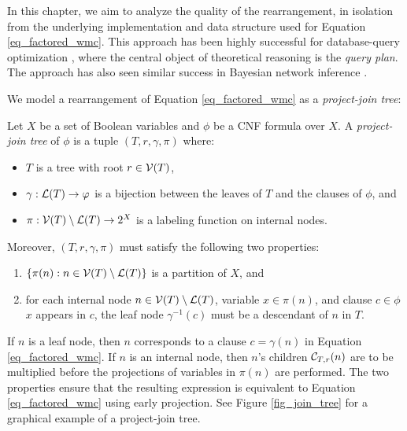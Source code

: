 In this chapter, we aim to analyze the quality of the rearrangement, in isolation from the underlying implementation and data structure used for Equation \eqref{eq_factored_wmc}.
This approach has been highly successful for database-query optimization \cite{MPPV04}, where the central object of theoretical reasoning is the \emph{query plan}.
The approach has also seen similar success in Bayesian network inference \cite{darwiche1998dynamic}.

We model a rearrangement of Equation \eqref{eq_factored_wmc} as a \emph{project-join tree}:
\begin{definition}
\label{def_jointree}
    Let $X$ be a set of Boolean variables and $\phi$ be a CNF formula over $X$.
    A \emph{project-join tree} of $\phi$ is a tuple $(T, r, \gamma, \pi)$ where:
    \begin{itemize}
        \item $T$ is a tree with root $r \in \mathcal{V}(T)$,
        \item $\gamma: \mathcal{L}(T) \to \varphi$ is a bijection between the leaves of $T$ and the clauses of $\phi$, and
        \item $\pi: \mathcal{V}(T) \setminus \mathcal{L}(T) \to 2^X$ is a labeling function on internal nodes.
    \end{itemize}
    Moreover, $(T, r, \gamma, \pi)$ must satisfy the following two properties:
    \begin{enumerate}[ref=\arabic*]
        \item $\{\pi(n) : n \in \mathcal{V}(T) \setminus \mathcal{L}(T) \}$ is a partition of $X$, and \label{prop1}
        \item for each internal node $n \in \mathcal{V}(T) \setminus \mathcal{L}(T)$, variable $x \in \pi(n)$, and clause $c \in \phi$ \st{} $x$ appears in $c$, the leaf node $\gamma^{-1}(c)$ must be a descendant of $n$ in $T$. \label{prop2}
    \end{enumerate}
\end{definition}
If $n$ is a leaf node, then $n$ corresponds to a clause $c = \gamma(n)$ in Equation \eqref{eq_factored_wmc}.
If $n$ is an internal node, then $n$'s children $\mathcal{C}_{T,r}(n)$ are to be multiplied before the projections of variables in $\pi(n)$ are performed.
The two properties ensure that the resulting expression is equivalent to Equation \eqref{eq_factored_wmc} using early projection.
See Figure \ref{fig_join_tree} for a graphical example of a project-join tree.
